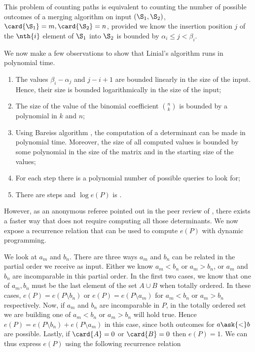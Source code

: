 This problem of counting paths is equivalent to counting the number of possible
outcomes of a merging algorithm on input \((\S_1,\S_2)\), \(\card{\S_1} = m,
\card{\S_2} = n\), provided we know the insertion position \(j\) of the
\(\nth{i}\) element of \(\S_1\) into \(\S_2\) is bounded by \(\alpha_i \le j <
\beta_i\).

We now make a few observations to show that Linial's algorithm runs in
polynomial time.

\begin{enumerate}
\item The values \(\beta_i - \alpha_j\) and \(j - i + 1\) are bounded
linearly in the size of the input. Hence, their size is bounded
logarithmically in the size of the input;
\item The size of the value of the binomial coefficient \(\binom{n}{k}\) is
bounded by a polynomial in \(k\) and \(n\);
\item Using Bareiss algorithm \cite{bareiss:1968}, the computation of a
determinant can be made in polynomial time. Moreover, the size of all computed
values is bounded by some polynomial in the size of the matrix and in the starting
size of the values;
\item For each step there is a polynomial number of possible queries to look for;
\item There are  steps and \(\log e(P)\) is .
\end{enumerate}

However, as an anonymous referee pointed out in the peer review of
\citet*{cardinal:2013}, there exists a faster way that does not require computing
all those determinants. We now expose a recurrence relation that can be used
to compute \(e(P)\) with dynamic programming.

We look at \(a_m\) and \(b_n\). There are three ways \(a_m\) and \(b_n\) can be
related in the partial order we receive as input. Either we know \(a_m < b_n\)
or \(a_m > b_n\), or \(a_m\) and \(b_n\) are incomparable in this partial
order. In the first two cases, we know that one of \(a_m,b_n\) must be the last
element of the set \(A \cup B\) when totally ordered. In these cases, \(e(P) =
e(P \setminus b_n)\) or \(e(P) = e(P \setminus a_m)\) for \(a_m < b_n\) or
\(a_m > b_n\) respectively. Now, if \(a_m\) and \(b_n\) are incomparable in
\(P\), in the totally ordered set we are building one of \(a_m < b_n\) or \(a_m
> b_n\) will hold true. Hence \(e(P) = e(P \setminus b_n) + e(P \setminus
a_m)\) in this case, since both outcomes for \(a \ask{<} b\) are possible.
Lastly, if \(\card{A} = 0\) or \(\card{B} = 0\) then \(e(P) = 1\). We can thus
express \(e(P)\) using the following recurrence relation

